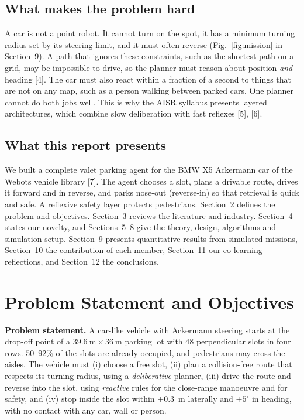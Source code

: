 \documentclass[12pt,a4paper]{article}
\begin{document}
\subsection{What makes the problem hard}
A car is not a point robot. It cannot turn on the spot, it has a minimum turning radius set by its steering limit, and it must often reverse (Fig.~\ref{fig:mission} in Section~9). A path that ignores these constraints, such as the shortest path on a grid, may be impossible to drive, so the planner must reason about position \emph{and} heading [4]. The car must also react within a fraction of a second to things that are not on any map, such as a person walking between parked cars. One planner cannot do both jobs well. This is why the AISR syllabus presents layered architectures, which combine slow deliberation with fast reflexes [5], [6].

\subsection{What this report presents}
We built a complete valet parking agent for the BMW X5 Ackermann car of the Webots vehicle library [7]. The agent chooses a slot, plans a drivable route, drives it forward and in reverse, and parks nose-out (reverse-in) so that retrieval is quick and safe. A reflexive safety layer protects pedestrians. Section~2 defines the problem and objectives. Section~3 reviews the literature and industry. Section~4 states our novelty, and Sections~5--8 give the theory, design, algorithms and simulation setup. Section~9 presents quantitative results from \NMissions{} simulated missions, Section~10 the contribution of each member, Section~11 our co-learning reflections, and Section~12 the conclusions.

\section{Problem Statement and Objectives}
\textbf{Problem statement.} A car-like vehicle with Ackermann steering starts at the drop-off point of a $39.6~\text{m} \times 36~\text{m}$ parking lot with 48 perpendicular slots in four rows. 50--92\% of the slots are already occupied, and pedestrians may cross the aisles. The vehicle must (i) choose a free slot, (ii) plan a collision-free route that respects its turning radius, using a \emph{deliberative} planner, (iii) drive the route and reverse into the slot, using \emph{reactive} rules for the close-range manoeuvre and for safety, and (iv) stop inside the slot within $\pm 0.3$~m laterally and $\pm 5^\circ$ in heading, with no contact with any car, wall or person.
\end{document}
